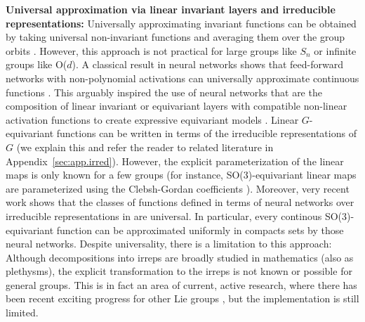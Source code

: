 \documentclass{article}
\renewcommand{\paragraph}[1]{\par\textbf{#1}}
\theoremstyle{Hogg}
\begin{document}
\paragraph{Universal approximation via linear invariant layers and irreducible representations:} 
Universally approximating invariant functions can be obtained by taking universal non-invariant functions and averaging them over the group orbits 
\cite{yarotsky2018universal, murphy2019relational}. However, this approach is not practical for large groups like $S_n$ or infinite groups like O($d$).
A classical result in neural networks shows that feed-forward networks with non-polynomial activations can universally approximate continuous functions \cite{leshno1993multilayer}.
This arguably inspired the use of neural networks that are the composition of linear invariant or equivariant layers with compatible non-linear activation functions to create expressive equivariant models \cite{kondor2018n, maron2018invariant, maron2020learning}. Linear $G$-equivariant functions can be written in terms of the irreducible representations of $G$ (we explain this and refer the reader to related literature in Appendix~\ref{sec:app.irred}).
However, the explicit parameterization of the linear maps is only known for a few groups (for instance, SO(3)-equivariant linear maps are parameterized using the Clebsh-Gordan coefficients \cite{fuchs2020se, thomas2018tensor, bogatskiy2020lorentz}). 
Moreover, very recent work \cite{dym2020universality} shows that the classes of functions defined in terms of neural networks over irreducible representations in \cite{fuchs2020se, thomas2018tensor} are universal. In particular, every continous SO(3)-equivariant function can be approximated uniformly in compacts sets by those neural networks. 
Despite universality, there is a limitation to this approach: Although decompositions into irreps are broadly studied in mathematics (also as plethysms), the explicit transformation to the irreps is not known or possible for general groups.  This is in fact an area of current, active research, where there has been recent exciting progress for other Lie groups \cite{alex2011numerical, ibort2017new}, but the implementation is still limited. 
\end{document}
